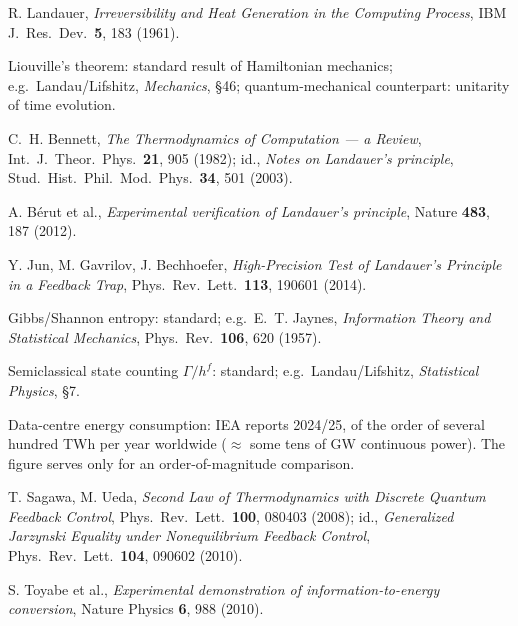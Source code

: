 \documentclass[11pt,a4paper]{article}
\begin{document}
\begingroup
\small
\begin{description}[leftmargin=3.2em,style=sameline,itemsep=0.3em]

\item[{[B1]}] R. Landauer, \emph{Irreversibility and Heat Generation in the
Computing Process}, IBM J.\ Res.\ Dev.\ \textbf{5}, 183 (1961).

\item[{[B2]}] Liouville's theorem: standard result of Hamiltonian mechanics; e.g.\
Landau/Lifshitz, \emph{Mechanics}, §46; quantum-mechanical counterpart: unitarity
of time evolution.

\item[{[B3]}] C.~H. Bennett, \emph{The Thermodynamics of Computation --- a
Review}, Int.\ J.\ Theor.\ Phys.\ \textbf{21}, 905 (1982); id., \emph{Notes on
Landauer's principle}, Stud.\ Hist.\ Phil.\ Mod.\ Phys.\ \textbf{34}, 501 (2003).

\item[{[B4]}] A. Bérut et al., \emph{Experimental verification of Landauer's
principle}, Nature \textbf{483}, 187 (2012).

\item[{[B5]}] Y. Jun, M. Gavrilov, J. Bechhoefer, \emph{High-Precision Test of
Landauer's Principle in a Feedback Trap}, Phys.\ Rev.\ Lett.\ \textbf{113},
190601 (2014).

\item[{[B6]}] Gibbs/Shannon entropy: standard; e.g.\ E.~T. Jaynes,
\emph{Information Theory and Statistical Mechanics}, Phys.\ Rev.\ \textbf{106},
620 (1957).

\item[{[B7]}] Semiclassical state counting $\Gamma/h^f$: standard; e.g.\
Landau/Lifshitz, \emph{Statistical Physics}, §7.

\item[{[B8]}] Data-centre energy consumption: IEA reports 2024/25, of the order of
several hundred TWh per year worldwide ($\approx$ some tens of GW continuous
power). The figure serves only for an order-of-magnitude comparison.

\item[{[B9]}] T. Sagawa, M. Ueda, \emph{Second Law of Thermodynamics with
Discrete Quantum Feedback Control}, Phys.\ Rev.\ Lett.\ \textbf{100}, 080403
(2008); id., \emph{Generalized Jarzynski Equality under Nonequilibrium Feedback
Control}, Phys.\ Rev.\ Lett.\ \textbf{104}, 090602 (2010).

\item[{[B10]}] S. Toyabe et al., \emph{Experimental demonstration of
information-to-energy conversion}, Nature Physics \textbf{6}, 988 (2010).


\end{description}
\end{document}
